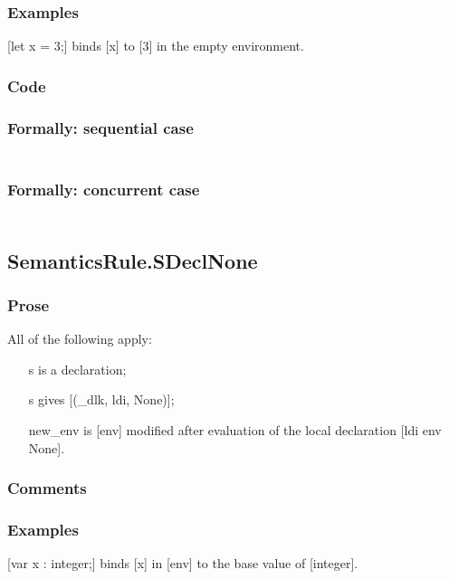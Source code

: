 \documentclass{book}
\begin{document}
    \subsubsection{Examples}
    [let x = 3;] binds [x] to [3] in the empty environment.

  \subsubsection{Code}

  \subsubsection{Formally: sequential case}
  \begin{align}
  \end{align} 

  \subsubsection{Formally: concurrent case}
  \begin{align}
  \end{align} 

\subsection{SemanticsRule.SDeclNone \label{sec:SemanticsRule.SDeclNone}}

    \subsubsection{Prose}
    All of the following apply:
    \begin{itemize}
    \item [s] is a declaration;
    \item [s] gives [(\_dlk, ldi, None)];
    \item [new\_env] is [env] modified after evaluation of the local declaration
      [ldi env None]. 
    \end{itemize}

    \subsubsection{Comments}

    \subsubsection{Examples}
    [var x : integer;] binds [x] in [env] to the base value of [integer].
\end{document}
